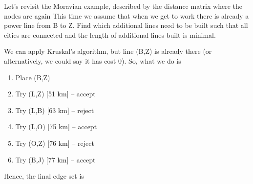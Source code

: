 

Let's revisit the Moravian example, described by the distance matrix 
where the nodes are again 
This time we assume that when we get to work there is already a power line from B to Z. Find which additional lines need to be built such that all cities are connected and the length of additional lines built is minimal. 


\solution
We can apply Kruskal's algorithm, but line (B,Z) is already there (or alternatively, we could say it has cost 0). So, what we do is
\begin{enumerate}[label=\arabic*.]
\item Place (B,Z)
\item Try (L,Z) [51 km] -- accept
\item Try (L,B) [63 km] -- reject
\item Try (L,O) [75 km] -- accept
\item Try (O,Z) [76 km] -- reject
\item Try (B,J) [77 km] -- accept
\end{enumerate}
Hence, the final edge set is 

